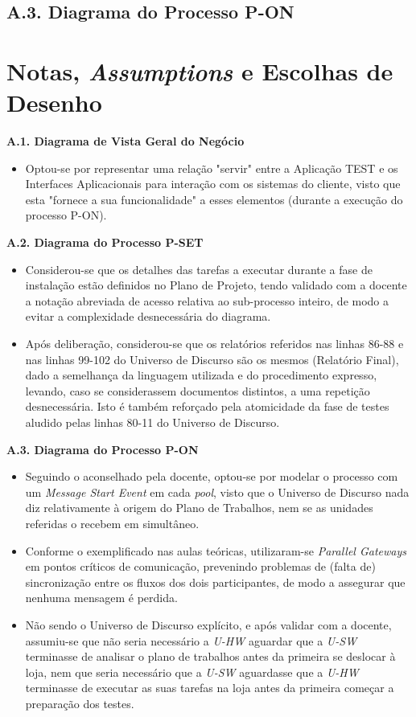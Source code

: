 \documentclass[12pt,a4paper]{article}
\begin{document}
\begin{landscape}
	\section*{A.3. Diagrama do Processo P-ON}
	
\end{landscape}

\section*{Notas, \emph{Assumptions} e Escolhas de Desenho} \label{notes}
\normalsize
\textbf{A.1. Diagrama de Vista Geral do Negócio}
\begin{itemize}
	\item Optou-se por representar uma relação "servir" entre a Aplicação TEST e os Interfaces Aplicacionais para interação com os sistemas do cliente, visto que esta "fornece a sua funcionalidade" a esses elementos (durante a execução do processo P-ON).
\end{itemize}
\textbf{A.2. Diagrama do Processo P-SET}
\begin{itemize}
	\item Considerou-se que os detalhes das tarefas a executar durante a fase de instalação estão definidos no Plano de Projeto, tendo validado com a docente a notação abreviada de acesso relativa ao sub-processo inteiro, de modo a evitar a complexidade desnecessária do diagrama.
	\item Após deliberação, considerou-se que os relatórios referidos nas linhas 86-88 e nas linhas 99-102 do Universo de Discurso são os mesmos (Relatório Final), dado a semelhança da linguagem utilizada e do procedimento expresso, levando, caso se considerassem documentos distintos, a uma repetição desnecessária. Isto é também reforçado pela atomicidade da fase de testes aludido pelas linhas 80-11 do Universo de Discurso.
\end{itemize}
\textbf{A.3. Diagrama do Processo P-ON}
\begin{itemize}
	\item Seguindo o aconselhado pela docente, optou-se por modelar o processo com um \emph{Message Start Event} em cada \emph{pool}, visto que o Universo de Discurso nada diz relativamente à origem do Plano de Trabalhos, nem se as unidades referidas o recebem em simultâneo.
	\item Conforme o exemplificado nas aulas teóricas, utilizaram-se \emph{Parallel Gateways} em pontos críticos de comunicação, prevenindo problemas de (falta de) sincronização entre os fluxos dos dois participantes, de modo a assegurar que nenhuma mensagem é perdida.
	\item Não sendo o Universo de Discurso explícito, e após validar com a docente, assumiu-se que não seria necessário a \emph{U-HW} aguardar que a \emph{U-SW} terminasse de analisar o plano de trabalhos antes da primeira se deslocar à loja, nem que seria necessário que a \emph{U-SW} aguardasse que a \emph{U-HW} terminasse de executar as suas tarefas na loja antes da primeira começar a preparação dos testes.
\end{itemize}
\end{document}
